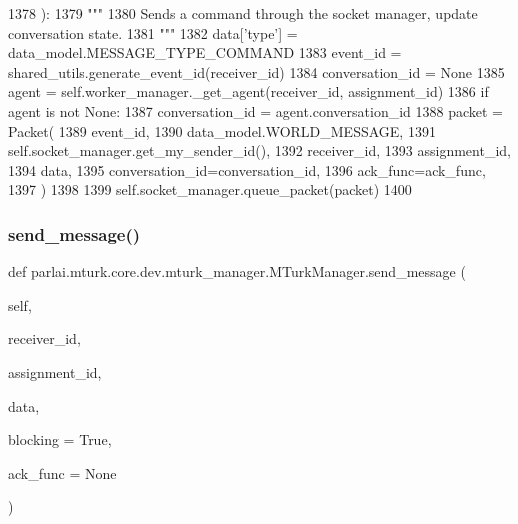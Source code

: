 \begin{DoxyCode}
1378     ):
1379         \textcolor{stringliteral}{"""}
1380 \textcolor{stringliteral}{        Sends a command through the socket manager, update conversation state.}
1381 \textcolor{stringliteral}{        """}
1382         data[\textcolor{stringliteral}{'type'}] = data\_model.MESSAGE\_TYPE\_COMMAND
1383         event\_id = shared\_utils.generate\_event\_id(receiver\_id)
1384         conversation\_id = \textcolor{keywordtype}{None}
1385         agent = self.worker\_manager.\_get\_agent(receiver\_id, assignment\_id)
1386         \textcolor{keywordflow}{if} agent \textcolor{keywordflow}{is} \textcolor{keywordflow}{not} \textcolor{keywordtype}{None}:
1387             conversation\_id = agent.conversation\_id
1388         packet = Packet(
1389             event\_id,
1390             data\_model.WORLD\_MESSAGE,
1391             self.socket\_manager.get\_my\_sender\_id(),
1392             receiver\_id,
1393             assignment\_id,
1394             data,
1395             conversation\_id=conversation\_id,
1396             ack\_func=ack\_func,
1397         )
1398 
1399         self.socket\_manager.queue\_packet(packet)
1400 
\end{DoxyCode}
\mbox{\label{classparlai_1_1mturk_1_1core_1_1dev_1_1mturk__manager_1_1MTurkManager_a8462af5dea67437813f6eb44d67e2306}} 
\subsubsection{\texorpdfstring{send\+\_\+message()}{send\_message()}}
{\footnotesize\ttfamily def parlai.\+mturk.\+core.\+dev.\+mturk\+\_\+manager.\+M\+Turk\+Manager.\+send\+\_\+message (\begin{DoxyParamCaption}\item[{}]{self,  }\item[{}]{receiver\+\_\+id,  }\item[{}]{assignment\+\_\+id,  }\item[{}]{data,  }\item[{}]{blocking = {\ttfamily True},  }\item[{}]{ack\+\_\+func = {\ttfamily None} }\end{DoxyParamCaption})}

